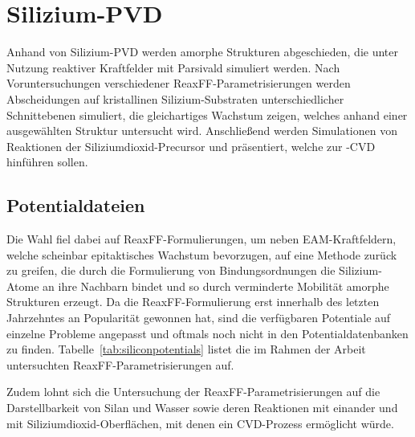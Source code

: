 \section{Silizium-PVD}
\label{siliconpvd}

Anhand von Silizium-PVD werden amorphe Strukturen abgeschieden, die unter Nutzung reaktiver Kraftfelder mit Parsivald simuliert werden.
Nach Voruntersuchungen verschiedener ReaxFF-Para\-metrisierungen werden Abscheidungen auf kristallinen Silizium-Substraten unterschiedlicher Schnittebenen simuliert, die gleichartiges Wachstum zeigen, welches anhand einer ausgewählten Struktur untersucht wird.
Anschließend werden Simulationen von Reaktionen der Siliziumdioxid-Precursor  und  präsentiert, welche zur -CVD hinführen sollen.

\subsection{Potentialdateien}

Die Wahl fiel dabei auf ReaxFF-Formulierungen, um neben EAM-Kraftfeldern, welche scheinbar epitaktisches Wachstum bevorzugen, auf eine Methode zurück zu greifen, die durch die Formulierung von Bindungsordnungen die Silizium-Atome an ihre Nachbarn bindet und so durch verminderte Mobilität amorphe Strukturen erzeugt.
Da die ReaxFF-Formulierung erst innerhalb des letzten Jahrzehntes an Popularität gewonnen hat, sind die verfügbaren Potentiale auf einzelne Probleme angepasst und oftmals noch nicht in den Potentialdatenbanken zu finden.
Tabelle~\ref{tab:siliconpotentials} listet die im Rahmen der Arbeit untersuchten ReaxFF-Parametrisierungen auf.

Zudem lohnt sich die Untersuchung der ReaxFF-Parametrisierungen auf die Darstellbarkeit von Silan und Wasser sowie deren Reaktionen mit einander und mit Siliziumdioxid-Oberflächen, mit denen ein CVD-Prozess ermöglicht würde.


